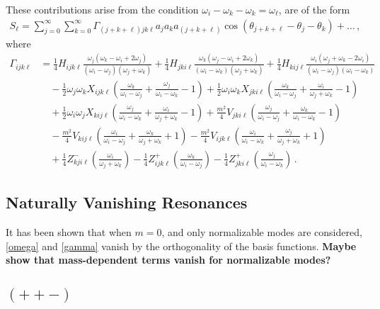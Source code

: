 \documentclass[letterpaper,11pt]{article}
\newcommand{\oi}{\omega_i}
\newcommand{\oj}{\omega_j}
\newcommand{\ok}{\omega_k}
\newcommand{\ol}{\omega_\ell}
\newcommand{\thj}{\theta_j}
\newcommand{\thk}{\theta_k}
\begin{document}
These contributions arise from the condition $\oi - \ok - \ok = \ol$, are of the form
\begin{align}
S_\ell = \sum_{j=0}^\infty \sum_{k=0}^\infty \Gamma_{(j+k+\ell) jk\ell} a_j a_k a_{(j+k+\ell)} \cos \left( \theta_{j+k+\ell} - \thj - \thk \right) + \ldots \, ,
\end{align}
where
\begin{align}
\label{gamma}
\Gamma_{ijk\ell} &= \frac{1}{4} H_{ijk\ell} \frac{\oj (\ok - \oi + 2\oj)}{(\oi - \oj)(\oj + \ok)} + \frac{1}{4} H_{jki\ell} \frac{\ok (\oj - \oi + 2\ok)}{(\oi - \ok)(\oj + \ok)} + \frac{1}{4} H_{kij\ell} \frac{\oi (\oj + \ok - 2\oi)}{(\oi - \oj)(\oi - \ok)} \nonumber \\
% 
& \quad -\frac{1}{2} \oj \ok X_{ijk\ell} \left( \frac{\ok}{\oi - \oj} + \frac{\oj}{\oi - \ok} - 1\right) + \frac{1}{2} \oi \ok X_{jki\ell} \left( \frac{\ok}{\oi - \oj} + \frac{\oi}{\oj + \ok} - 1 \right) \nonumber \\
%
& \quad + \frac{1}{2} \oi \oj X_{kij\ell} \left( \frac{\oj}{\oi - \ok} + \frac{\oi}{\oj + \ok} -1 \right) + \frac{m^2}{4} V_{jki\ell} \left( \frac{\oj}{\oi - \oj} + \frac{\ok}{\oi - \ok} -1\right) \nonumber \\
%
& \quad - \frac{m^2}{4} V_{kij\ell} \left( \frac{\oi}{\oi - \oj} + \frac{\ok}{\oj + \ok} + 1\right) - \frac{m^2}{4} V_{ijk\ell} \left( \frac{\oi}{\oi - \ok} + \frac{\oj}{\oj + \ok} + 1 \right) \nonumber \\
%
& \quad + \frac{1}{4} Z^-_{kji\ell} \left( \frac{\oi}{\oj + \ok}\right) - \frac{1}{4} Z^+_{ijk\ell} \left( \frac{\ok}{\oi - \oj} \right) - \frac{1}{4} Z^+_{jki\ell} \left( \frac{\oj}{\oi - \ok}\right) \, .
\end{align}


\subsection{Naturally Vanishing Resonances}

It has been shown that when $m=0$, and only normalizable modes are considered, \eqref{omega} and \eqref{gamma} vanish by the orthogonality of the basis functions. {\bf Maybe show that mass-dependent terms vanish for normalizable modes?}


\subsection{$(++-)$}
\label{subs: ttf resonances}
\end{document}
